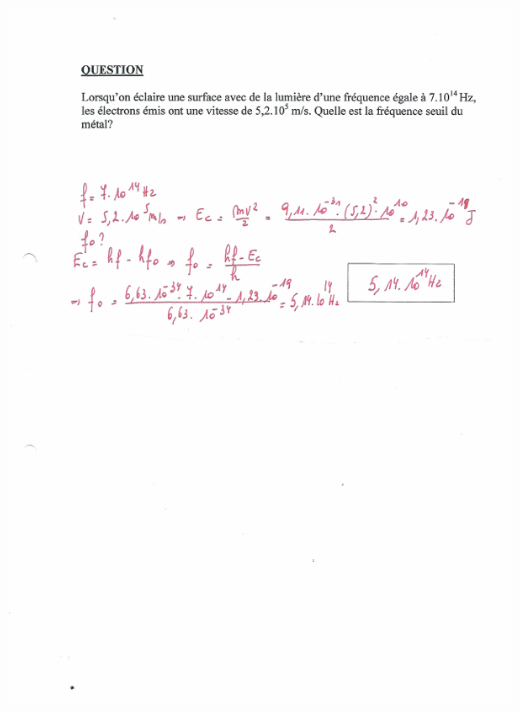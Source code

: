 {\includegraphics[width=17.498cm,height=24.13cm]{Pictures/10000001000002570000033B282FC06DC4D6D42C.png}

}
